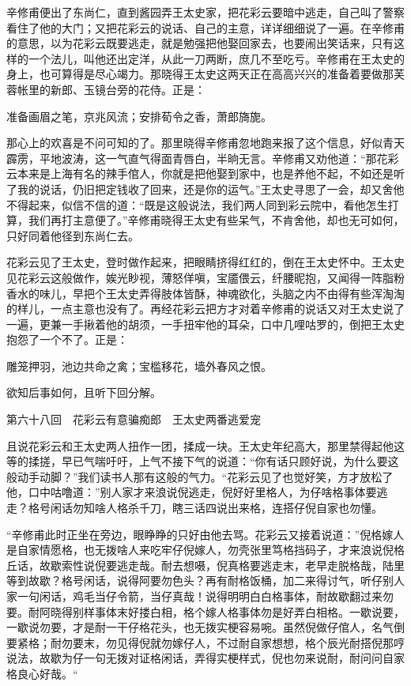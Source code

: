 \documentclass[12pt,UTF8]{ctexbook}
\begin{document}
{{{辛修甫便出了东尚仁，直到酱园弄王太史家，把花彩云要暗中逃走，自己叫了警察看住了他的大门；又把花彩云的说话、自己的主意，详详细细说了一遍。在辛修甫的意思，以为花彩云既要逃走，就是勉强把他娶回家去，也要闹出笑话来，只有这样的一个法儿，叫他还出定洋，从此一刀两断，庶几不至吃亏。辛修甫在王太史的身上，也可算得是尽心竭力。那晓得王太史这两天正在高高兴兴的准备着要做那芙蓉帐里的新郎、玉镜台旁的花侍。正是：

准备画眉之笔，京兆风流；安排荀令之香，萧郎旖旎。

那心上的欢喜是不问可知的了。那里晓得辛修甫忽地跑来报了这个信息，好似青天霹雳，平地波涛，这一气直气得面青唇白，半晌无言。辛修甫又劝他道：“那花彩云本来是上海有名的辣手倌人，你就是把他娶到家中，也是养他不起，不如还是听了我的说话，仍旧把定钱收了回来，还是你的运气。”王太史寻思了一会，却又舍他不得起来，似信不信的道：“既是这般说法，我们两人同到彩云院中，看他怎生打算，我们再打主意便了。”辛修甫晓得王太史有些呆气，不肯舍他，却也无可如何，只好同着他径到东尚仁去。

花彩云见了王太史，登时做作起来，把眼睛挤得红红的，倒在王太史怀中。王太史见花彩云这般做作，娭光眇视，薄怒佯嗔，宝靥偎云，纤腰昵抱，又闻得一阵脂粉香水的味儿，早把个王太史弄得肢体皆酥，神魂欲化，头脑之内不由得有些浑淘淘的样儿，一点主意也没有了。再经花彩云把方才对着辛修甫的说话又对王太史说了一遍，更兼一手揪着他的胡须，一手扭牢他的耳朵，口中几哩咕罗的，倒把王太史抱怨了一个不了。正是：

雕笼押羽，池边共命之禽；宝槛移花，墙外春风之恨。

欲知后事如何，且听下回分解。





第六十八回　花彩云有意骗痴郎　王太史两番逃爱宠





且说花彩云和王太史两人扭作一团，揉成一块。王太史年纪高大，那里禁得起他这等的揉搓，早已气喘吁吁，上气不接下气的说道：“你有话只顾好说，为什么要这般动手动脚？”我们读书人那有这般的气力。“花彩云见了也觉好笑，方才放松了他，口中咕噜道：”别人家才来浪说倪逃走，倪好好里格人，为仔啥格事体要逃走？格号闲话勿知啥人格杀千刀，瞎三话四说出来格，连搭仔倪自家也勿懂。

“辛修甫此时正坐在旁边，眼睁睁的只好由他去骂。花彩云又接着说道：”倪格嫁人是自家情愿格，也无拨啥人来吃牢仔倪嫁人，勿壳张里笃格挡码子，才来浪说倪格丘话，故歇索性说倪要逃走哉。耐去想嗫，倪真格要逃走末，老早走脱格哉，陆里等到故歇？格号闲话，说得阿要勿色头？再有耐格饭桶，加二来得讨气，听仔别人家一句闲话，鸡毛当仔令箭，当仔真哉！说得明明白白格事体，耐故歇翻过来勿要。耐阿晓得别样事体末好搂白相，格个嫁人格事体勿是好弄白相格。一歇说要，一歇说勿要，才是耐一干仔格花头，也无拨实梗容易啘。虽然倪做仔倌人，名气倒要紧格；耐勿要末，勿见得倪就勿嫁仔人，不过耐自家想想，格个辰光耐搭倪那哼说法，故歇为仔一句无拨对证格闲话，弄得实梗样式，倪也勿来说耐，耐问问自家格良心好哉。“

}}}
\end{document}
